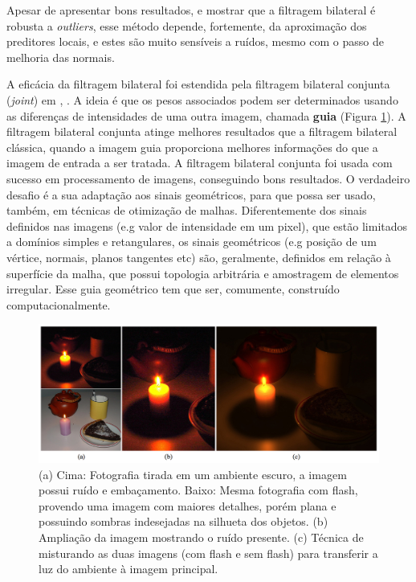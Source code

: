 Apesar de apresentar bons resultados, e mostrar que a filtragem bilateral é robusta a \textit{outliers}, esse método depende, fortemente, da aproximação dos preditores locais, e estes são muito sensíveis a ruídos, mesmo com o passo de melhoria das normais. 

A eficácia da filtragem bilateral foi estendida pela filtragem bilateral conjunta (\textit{joint}) em \cite{eisemann2004flash}, \cite{petschnigg2004digital}. A ideia é que os pesos associados podem ser determinados usando as diferenças de intensidades de uma outra imagem, chamada \textbf{guia} (Figura \ref{fig:flash-noflash}). A filtragem bilateral conjunta atinge melhores resultados que a filtragem bilateral clássica, quando a imagem guia proporciona melhores informações do que a imagem de entrada a ser tratada. A filtragem bilateral conjunta foi usada com sucesso em processamento de imagens, conseguindo bons resultados. O verdadeiro desafio é a sua adaptação aos sinais geométricos, para que possa ser usado, também, em técnicas de otimização de malhas. Diferentemente dos sinais definidos nas imagens (e.g valor de intensidade em um pixel), que estão limitados a domínios simples e retangulares, os sinais geométricos (e.g posição de um vértice, normais, planos tangentes etc) são, geralmente, definidos em relação à superfície da malha, que possui topologia arbitrária e amostragem de elementos irregular. Esse guia geométrico tem que ser, comumente, construído computacionalmente.

\begin{figure}[!h]
\captionsetup{width=\linewidth}
\centering
\includegraphics[scale=0.3]{figuras/flash-noflash.png}
\caption{(a) Cima: Fotografia tirada em um ambiente escuro, a imagem possui ruído e embaçamento. Baixo: Mesma fotografia com flash, provendo uma imagem com maiores detalhes, porém plana e possuindo sombras indesejadas na silhueta dos objetos. (b) Ampliação da imagem mostrando o ruído presente. (c) Técnica de \cite{eisemann2004flash} misturando as duas imagens (com flash e sem flash) para transferir a luz do ambiente à imagem principal.}
\label{fig:flash-noflash}
\end{figure}

